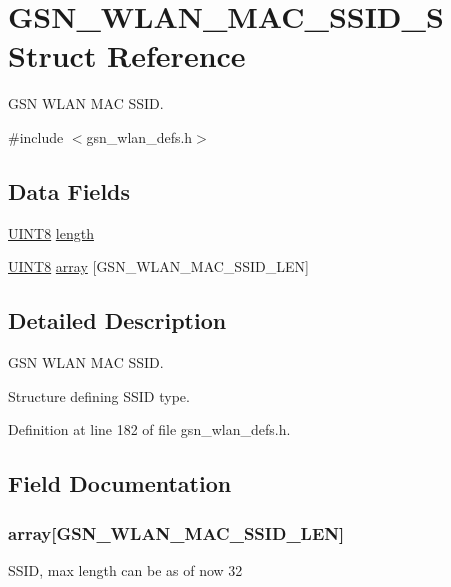 \hypertarget{a00417}{
\section{GSN\_\-WLAN\_\-MAC\_\-SSID\_\-S Struct Reference}
\label{a00417}
}


GSN WLAN MAC SSID.  




{\ttfamily \#include $<$gsn\_\-wlan\_\-defs.h$>$}

\subsection*{Data Fields}
\begin{DoxyCompactItemize}
\item 
\hyperlink{a00660_gab27e9918b538ce9d8ca692479b375b6a}{UINT8} \hyperlink{a00417_ae360fb41f422c7c83b87d9af070cbd31}{length}
\item 
\hyperlink{a00660_gab27e9918b538ce9d8ca692479b375b6a}{UINT8} \hyperlink{a00417_a5ff4e1319afe0a9ae52157d2ff4ef3a0}{array} \mbox{[}GSN\_\-WLAN\_\-MAC\_\-SSID\_\-LEN\mbox{]}
\end{DoxyCompactItemize}


\subsection{Detailed Description}
GSN WLAN MAC SSID. 

Structure defining SSID type. 

Definition at line 182 of file gsn\_\-wlan\_\-defs.h.



\subsection{Field Documentation}
\hypertarget{a00417_a5ff4e1319afe0a9ae52157d2ff4ef3a0}{
\subsubsection[{array}]{ {\bf array}\mbox{[}GSN\_\-WLAN\_\-MAC\_\-SSID\_\-LEN\mbox{]}}}
\label{a00417_a5ff4e1319afe0a9ae52157d2ff4ef3a0}
SSID, max length can be as of now 32 

